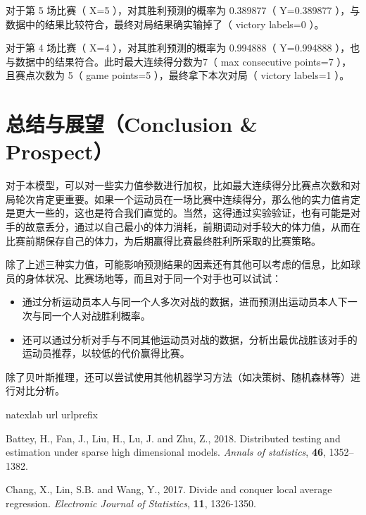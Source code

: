 \documentclass[12pt]{article}
\begin{document}
对于第 5 场比赛（ X=5 ），对其胜利预测的概率为 0.389877（ Y=0.389877 ），与数据中的结果比较符合，最终对局结果确实输掉了（ victory labels=0 ）。

对于第 4 场比赛（ X=4 ），对其胜利预测的概率为 0.994888（ Y=0.994888 ），也与数据中的结果符合。此时最大连续得分数为7（ max consecutive points=7 ），且赛点次数为 5（ game points=5 ），最终拿下本次对局（ victory labels=1 ）。


\section{总结与展望（Conclusion \& Prospect）}
对于本模型，可以对一些实力值参数进行加权，比如最大连续得分比赛点次数和对局轮次肯定更重要。如果一个运动员在一场比赛中连续得分，那么他的实力值肯定是更大一些的，这也是符合我们直觉的。当然，这得通过实验验证，也有可能是对手的故意丢分，通过以自己最小的体力消耗，前期调动对手较大的体力值，从而在比赛前期保存自己的体力，为后期赢得比赛最终胜利所采取的比赛策略。

除了上述三种实力值，可能影响预测结果的因素还有其他可以考虑的信息，比如球员的身体状况、比赛场地等，而且对于同一个对手也可以试试：
\begin{itemize}
	\item 通过分析运动员本人与同一个人多次对战的数据，进而预测出运动员本人下一次与同一个人对战胜利概率。
	\item 还可以通过分析对手与不同其他运动员对战的数据，分析出最优战胜该对手的运动员推荐，以较低的代价赢得比赛。
\end{itemize}

除了贝叶斯推理，还可以尝试使用其他机器学习方法（如决策树、随机森林等）进行对比分析。

\begin{thebibliography}{100}
	\expandafter\ifx\csname natexlab\endcsname\relax\def\natexlab#1{#1}\fi
	\expandafter\ifx\csname url\endcsname\relax
	\def\url#1{\texttt{#1}}\fi
	\expandafter\ifx\csname urlprefix\endcsname\relax\def\urlprefix{URL }\fi

Battey, H., Fan, J., Liu, H., Lu, J. and Zhu, Z., 2018. Distributed testing and estimation under sparse high dimensional models. \textit{Annals of statistics}, \textbf{46}, 1352–1382.

Chang, X., Lin, S.B. and Wang, Y., 2017. Divide and conquer local average regression. \textit{Electronic Journal of Statistics}, \textbf{11}, 1326-1350.

\end{thebibliography}
\end{document}
